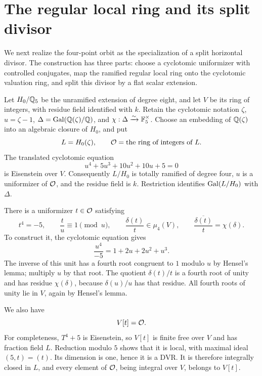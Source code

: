 \section{The regular local ring and its split divisor}
\label{sec:local-geometry}

We next realize the four-point orbit as the specialization of a split
horizontal divisor. The construction has three parts: choose a
cyclotomic uniformizer with controlled conjugates, map the ramified
regular local ring onto the cyclotomic valuation ring, and split this divisor
by a flat scalar extension.

Let $H_0/\mathbb Q_5$ be the unramified extension of degree eight, and let $V$
be its ring of integers, with residue field identified with $k$.
Retain the cyclotomic notation $\zeta$, $u=\zeta-1$,
$\Delta=\operatorname{Gal}(\mathbb Q(\zeta)/\mathbb Q)$, and
$\chi:\Delta\xrightarrow{\sim}\mathbb F_5^\times$.
Choose an embedding of $\mathbb Q(\zeta)$ into an algebraic closure of $H_0$,
and put
\[
    L=H_0(\zeta),\qquad \mathcal O=\text{the ring of integers of }L.
\]
The translated cyclotomic equation
\[
    u^4+5u^3+10u^2+10u+5=0
\]
is Eisenstein over $V$. Consequently $L/H_0$ is totally ramified of
degree four, $u$ is a uniformizer of $\mathcal O$, and the residue field is
$k$. Restriction identifies $\operatorname{Gal}(L/H_0)$ with $\Delta$.

There is a uniformizer $t\in\mathcal O$ satisfying
\begin{equation}
\label{eq:cyclotomic-uniformizer}
    t^4=-5,\qquad \frac tu\equiv1\pmod u,\qquad
    \frac{\delta(t)}t\in\mu_4(V),\qquad
    \overline{\frac{\delta(t)}t}=\chi(\delta).
\end{equation}
To construct it, the cyclotomic equation gives
\[
    \frac{u^4}{-5}=1+2u+2u^2+u^3.
\]
The inverse of this unit has a fourth root congruent to $1$ modulo $u$
by Hensel's lemma; multiply $u$ by that root. The quotient
$\delta(t)/t$ is a fourth root of unity and has residue $\chi(\delta)$,
because $\delta(u)/u$ has that residue. All fourth roots of unity lie
in $V$, again by Hensel's lemma.

We also have
\begin{equation}
\label{eq:monogenic-dvr}
    V[t]=\mathcal O.
\end{equation}
For completeness, $T^4+5$ is Eisenstein, so $V[t]$ is finite free over
$V$ and has fraction field $L$. Reduction modulo $5$ shows that it is
local, with maximal ideal $(5,t)=(t)$. Its dimension is one, hence it
is a DVR. It is therefore integrally closed in $L$, and every element
of $\mathcal O$, being integral over $V$, belongs to $V[t]$.

